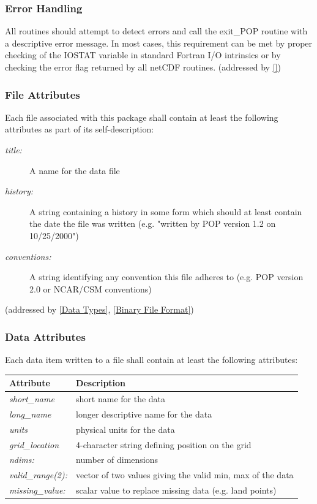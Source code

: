 \documentclass[11pt]{article}
\begin{document}
\subsubsection{Error Handling}
\label{Error Handling}
All routines should attempt to detect errors and call the
exit\_POP routine with a descriptive error message.
In most cases, this requirement can be met by proper
checking of the IOSTAT variable in standard Fortran I/O
intrinsics or by checking the error flag returned by all netCDF routines.
(addressed by \ref{})

\subsubsection{File Attributes}
\label{File Attributes}
Each file associated with this package shall contain at
least the following attributes as part of its self-description:

\begin{description}
\item [\textit{title:}] A name for the data file
\item [\textit{history:}] A string containing a history in some form
which should at least contain the date the file was
written (e.g. "written by POP version 1.2 on 10/25/2000")
\item [\textit{conventions:}] A string identifying any convention
this file adheres to (e.g. POP version 2.0 or NCAR/CSM conventions)
\end{description}
(addressed by \ref{Data Types}, \ref{Binary File Format})

\subsubsection{Data Attributes}
\label{Data Attributes}
Each data item written to a file shall contain at least
the following attributes:

\begin{tabular}{|| l | l ||} \hline \hline
Attribute & Description \\
\hline \hline
 \textit{short\_name}  &  {short name for the data} \\
 \textit{long\_name}   &  {longer descriptive name for the data} \\
 \textit{units}        &  {physical units for the data} \\
 \textit{grid\_location} & {4-character string defining position on the grid} \\
 \textit{ndims:}          & {number of dimensions} \\
 \textit{valid\_range(2):} & {vector of two values giving the
valid min, max of the data} \\
 \textit{missing\_value:} & {scalar value to replace
missing data (e.g. land points)} \\
\hline \hline
\end{tabular}
\end{document}
